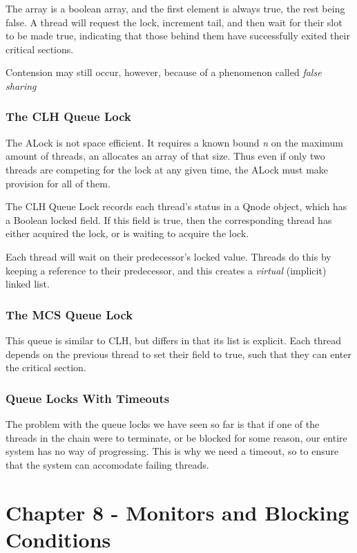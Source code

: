 \documentclass[11pt]{article}
\begin{document}
The array is a boolean array, and the first element is always true, the rest being false. A
thread will request the lock, increment tail, and then wait for their slot to be made true,
indicating that those behind them have successfully exited their critical sections.

Contension may still occur, however, because of a phenomenon called \emph{false sharing}

\subsubsection{The CLH Queue Lock}
\label{sec:orgheadline7}

The ALock is not space efficient. It requires a known bound \emph{n} on the maximum amount of threads,
an allocates an array of that size. Thus even if only two threads are competing for the lock at
any given time, the ALock must make provision for all of them.

The CLH Queue Lock records each thread's status in a Qnode object, which has a Boolean locked
field. If this field is true, then the corresponding thread has either acquired the lock, or
is waiting to acquire the lock.

Each thread will wait on their predecessor's locked value. Threads do this by keeping a 
reference to their predecessor, and this creates a \emph{virtual} (implicit) linked list.

\subsubsection{The MCS Queue Lock}
\label{sec:orgheadline8}

This queue is similar to CLH, but differs in that its list is explicit. Each thread depends
on the previous thread to set their field to true, such that they can enter the critical 
section.

\subsubsection{Queue Locks With Timeouts}
\label{sec:orgheadline9}

The problem with the queue locks we have seen so far is that if one of the threads in the chain
were to terminate, or be blocked for some reason, our entire system has no way of progressing.
This is why we need a timeout, so to ensure that the system can accomodate failing threads.

\section{Chapter 8 - Monitors and Blocking Conditions}
\label{sec:orgheadline19}
\end{document}
